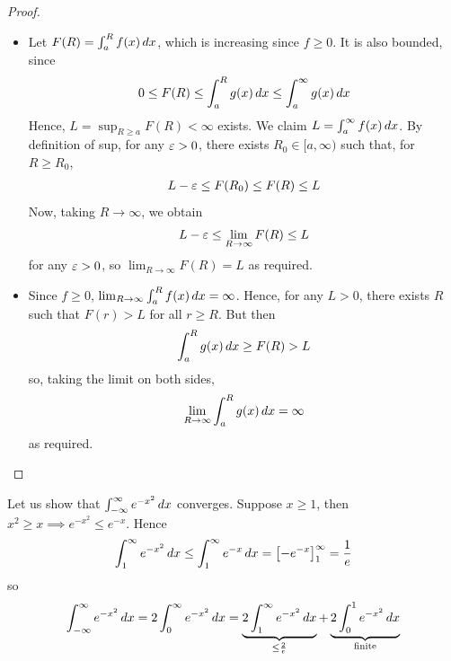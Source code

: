\documentclass{../../template/note}
\begin{document}
    \begin{proof}
        \begin{itemize}
            \item Let \(F(R) = \int_a^R f(x) \,d{x}\), which is increasing since \(f \geq 0\). It is also bounded, since
            \begin{align*}
                0 \leq F(R) \leq \int_a^R g(x) \,d{x} \leq \int_a^\infty g(x) \,d{x}
            \end{align*}
            Hence, \(L = \sup_{R \geq a} F(R) < \infty\) exists. We claim \(L = \int_a^\infty f(x) \,d{x}\). By definition of sup, for any \(\varepsilon > 0\), there exists \(R_0 \in [a, \infty)\) such that, for \(R \geq R_0\),
            \begin{align*}
                L-\varepsilon \leq F(R_0) \leq F(R) \leq L
            \end{align*}
            Now, taking \(R \to \infty\), we obtain
            \begin{align*}
                L-\varepsilon \leq \lim_{R \to \infty} F(R) \leq L
            \end{align*}
            for any \(\varepsilon > 0\), so \(\lim_{R \to \infty} F(R) = L\) as required.
            \item Since \(f \geq 0\), \(\lim_{R \to \infty} \int_a^R f(x) \,d{x} = \infty\). Hence, for any \(L > 0\), there exists \(R\) such that \(F(r) > L\) for all \(r \geq R\). But then
            \begin{align*}
                \int_a^R g(x) \,d{x} \geq F(R) > L
            \end{align*}
            so, taking the limit on both sides,
            \begin{align*}
                \lim_{R \to \infty} \int_a^R g(x) \,d{x} = \infty
            \end{align*}
            as required.
        \end{itemize}
    \end{proof}
    
    \begin{example*}
        Let us show that \(\int_{-\infty}^\infty e^{-x^2} \,d{x}\) converges. Suppose \(x \geq 1\), then \(x^2 \geq x \implies e^{-x^2} \leq e^{-x}\). Hence
        \begin{align*}
            \int_1^\infty e^{-x^2} \,d{x} \leq \int_1^\infty e^{-x} \,d{x} = \left[-e^{-x}\right]_1^{\infty} = \frac 1 e
        \end{align*}
        so
        \begin{align*}
            \int_{-\infty}^\infty e^{-x^2} \,d{x} = 2 \int_0^\infty e^{-x^2} \,d{x} = \underbrace{2 \int_1^\infty e^{-x^2} \,d{x}}_{\leq \frac 2 e} + \underbrace{2 \int_0^1 e^{-x^2} \,d{x}}_{\text{finite}}
        \end{align*}
    \end{example*}
    
\end{document}
